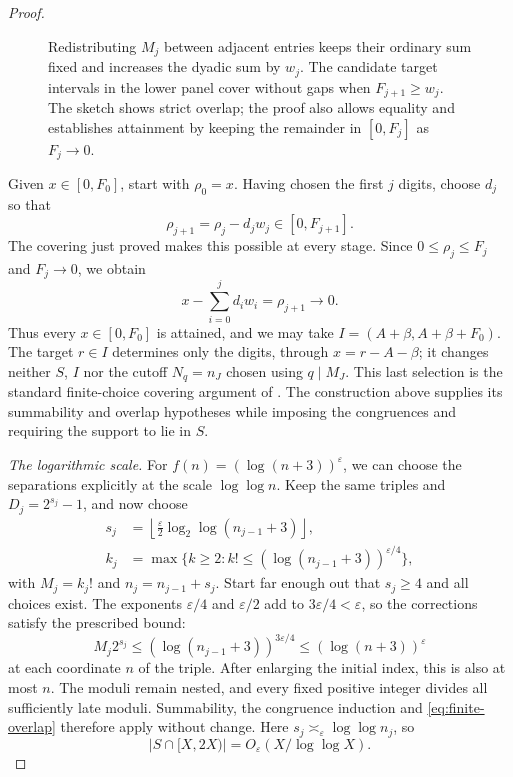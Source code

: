 \documentclass[11pt]{article}
\begin{document}
\begin{proof}
\begin{figure}[t]
\caption{Redistributing $M_j$ between adjacent entries keeps their ordinary
sum fixed and increases the dyadic sum by $w_j$.  The candidate target
intervals in the lower panel cover without gaps when $F_{j+1}\ge w_j$.
The sketch shows strict overlap; the proof also allows equality and
establishes attainment by keeping the remainder in $[0,F_j]$ as $F_j\to0$.}
\label{fig:correction-and-overlap}
\end{figure}
Given $x\in[0,F_0]$, start with $\rho_0=x$.  Having chosen the first
$j$ digits, choose $d_j$ so that
\[
 \rho_{j+1}=\rho_j-d_jw_j\in[0,F_{j+1}].
\]
The covering just proved makes this possible at every stage.  Since $0\le\rho_j\le F_j$ and $F_j\to0$, we obtain
\[
 x-\sum_{i=0}^{j}d_iw_i=\rho_{j+1}\longrightarrow0.
\]
Thus every $x\in[0,F_0]$ is attained, and we may take
$I=(A+\beta,A+\beta+F_0)$.  The target $r\in I$ determines only the
digits, through $x=r-A-\beta$; it changes neither $S$, $I$ nor the
cutoff $N_q=n_J$ chosen using $q\mid M_J$.
This last selection is the standard finite-choice covering argument
of \cite[Lemma~4]{crmarickovac2025}.  The construction above supplies
its summability and overlap hypotheses while imposing the congruences
and requiring the support to lie in $S$.

\par\medskip\noindent\emph{The logarithmic scale.}
For $f(n)=(\log(n+3))^\varepsilon$, we can choose the separations
explicitly at the scale $\log\log n$.  Keep the same triples and
$D_j=2^{s_j}-1$, and now choose
\[
 \begin{aligned}
 s_j&=\left\lfloor\frac{\varepsilon}{2}
               \log_2\log(n_{j-1}+3)\right\rfloor,\\
 k_j&=\max\{k\ge2:k!\le(\log(n_{j-1}+3))^{\varepsilon/4}\},
 \end{aligned}
\]
with $M_j=k_j!$ and $n_j=n_{j-1}+s_j$.  Start far enough out that
$s_j\ge4$ and all choices exist.  The exponents $\varepsilon/4$ and
$\varepsilon/2$ add to $3\varepsilon/4<\varepsilon$, so the corrections
satisfy the prescribed bound:
\[
 M_j2^{s_j}\le(\log(n_{j-1}+3))^{3\varepsilon/4}
             \le(\log(n+3))^\varepsilon
\]
at each coordinate $n$ of the triple.  After enlarging the initial
index, this is also at most $n$.  The moduli remain nested, and every fixed positive integer divides all
sufficiently late moduli.  Summability, the congruence induction and
\eqref{eq:finite-overlap} therefore apply without change.  Here
$s_j\asymp_\varepsilon\log\log n_j$, so
\[
 |S\cap[X,2X)|=O_\varepsilon(X/\log\log X).
\]


\end{proof}
\end{document}
